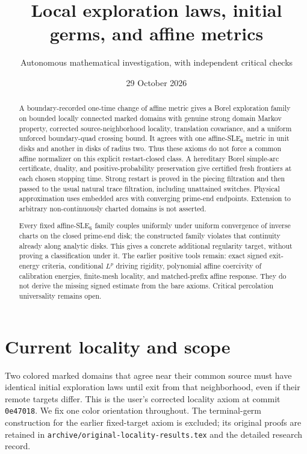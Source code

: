 \documentclass[11pt]{article}
\title{Local exploration laws, initial germs, and affine metrics}
\author{Autonomous mathematical investigation, with independent critical checks}
\date{29 October 2026}
\theoremstyle{definition}\newtheorem{definition}[theorem]{Definition}
\theoremstyle{remark}\newtheorem{remark}[theorem]{Remark}
\begin{document}
\maketitle
\begin{abstract}
A boundary-recorded one-time change of affine metric gives a Borel exploration family on bounded locally connected marked domains with genuine strong domain Markov property, corrected source-neighborhood locality, translation covariance, and a uniform unforced boundary-quad crossing bound. It agrees with one affine-SLE$_6$ metric in unit disks and another in disks of radius two. Thus these axioms do not force a common affine normalizer on this explicit restart-closed class. A hereditary Borel simple-arc certificate, duality, and positive-probability preservation give certified fresh frontiers at each chosen stopping time. Strong restart is proved in the piecing filtration and then passed to the usual natural trace filtration, including unattained switches. Physical approximation uses embedded arcs with converging prime-end endpoints. Extension to arbitrary non-continuously charted domains is not asserted.

Every fixed affine-SLE$_6$ family couples uniformly under uniform convergence of inverse charts on the closed prime-end disk; the constructed family violates that continuity already along analytic disks. This gives a concrete additional regularity target, without proving a classification under it. The earlier positive tools remain: exact signed exit-energy criteria, conditional $L^p$ driving rigidity, polynomial affine coercivity of calibration energies, finite-mesh locality, and matched-prefix affine response. They do not derive the missing signed estimate from the bare axioms. Critical percolation universality remains open.
\end{abstract}

\section{Current locality and scope}
Two colored marked domains that agree near their common source must have
identical initial exploration laws until exit from that neighborhood,
even if their remote targets differ. This is the user's corrected locality
axiom at commit \texttt{0e47018}. We fix one color orientation throughout.
The terminal-germ construction for the earlier fixed-target axiom is
excluded; its original proofs are retained in
\texttt{archive/original-locality-results.tex} and the detailed research record.
\end{document}
